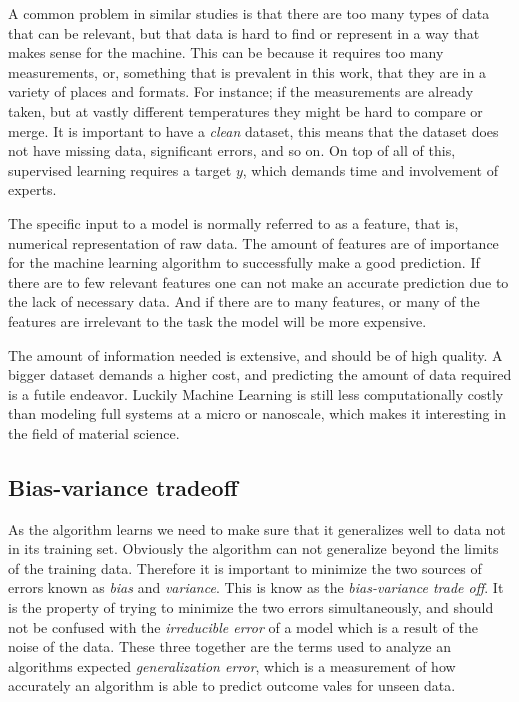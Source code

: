 	A common problem in similar studies is that there are too many types of data that can be relevant, but that data is hard to find or represent in a way that makes sense for the machine. This can be because it requires too many measurements, or, something that is prevalent in this work, that they are in a variety of places and formats. For instance; if the measurements are already taken, but at vastly different temperatures they might be hard to compare or merge. It is important to have a \textit{clean} dataset, this means that the dataset does not have missing data, significant errors, and so on. On top of all of this, supervised learning requires a target $y$, which demands time and involvement of experts.
	
	The specific input to a model is normally referred to as a feature, that is, numerical representation of raw data. The amount of features are of importance for the machine learning algorithm to successfully make a good prediction. If there are to few relevant features one can not make an accurate prediction due to the lack of necessary data. And if there are to many features, or many of the features are irrelevant to the task the model will be more expensive.
	
	The amount of information needed is extensive, and should be of high quality. A bigger dataset demands a higher cost, and predicting the amount of data required is a futile endeavor. Luckily Machine Learning is still less computationally costly than modeling full systems at a micro or nanoscale, which makes it interesting in the field of material science.
	
	
\subsection{Bias-variance tradeoff}\label{sec:Bias-variance tradeoff}

As the algorithm learns we need to make sure that it generalizes well to data not in its training set. Obviously the algorithm can not generalize beyond the limits of the training data. Therefore it is important to minimize the two sources of errors known as \textit{bias} and \textit{variance}. This is know as the \textit{bias-variance trade off}. It is the property of trying to minimize the two errors simultaneously, and should not be confused with the \textit{irreducible error} of a model which is a result of the noise of the data. These three together are the terms used to analyze an algorithms expected \textit{generalization error}, which is a measurement of how accurately an algorithm is able to predict outcome vales for unseen data.


